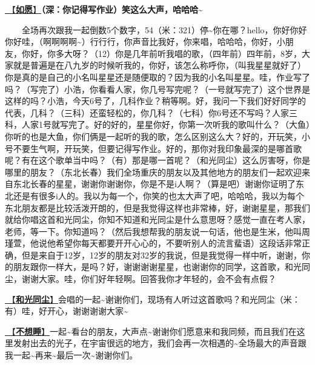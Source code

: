 \documentclass[]{ctexbook}
\begin{document}
\hyperref[As-you-wish]{🎵【\textbf{如愿}】}\textbf{（深：你记得写作业）笑这么大声，哈哈哈\textasciitilde{}}

  全场再次跟我一起倒数5个数字，54（米：321）停\textasciitilde 你在哪？hello，你好你好你好哇，（啊啊啊啊\textasciitilde）行行行，你声音比我好，你来唱，哈哈哈，你好，小朋友，你好，你多大呀？（12）你是几年前听我唱的歌，（四年前）四年前，8岁，大家就是普遍是在八九岁的时候听我的，你好，该怎么称呼你，（叫我星星就好了）你是真的是自己的小名叫星星还是随便取的？因为我的小名叫星星。哇，作业写了吗？（写完了）小浩，你看看人家，你几号写完呢？（一号就写完了）这个世界是这样的吗？小浩，今天6号了，几科作业？稍等啊。好，我问一下我们好好同学的代表，几科？（三科）还蛮轻松的，你几科？（七科）你6号还不写吗？人家三科，人家1号就写完了。好的好的，星星你好，你第一次听我的歌叫什么？（大鱼）你听的也是大鱼，你们俩是一起听的我的歌，怎么区别这么大？好的，开玩笑，小号不要生气啊，开玩笑，但要记得写作业。好的，那你对我印象最深的是哪首歌呢？有在这个歌单当中吗？（有）那是哪一首呢？（和光同尘）这么厉害呀，你是哪里的朋友？（东北长春）我们全场重庆的朋友以及其他地方的朋友们一起欢迎来自东北长春的星星，谢谢你谢谢你，你是不是i人啊？（算是吧）谢谢你证明了东北还是有很多i人的。我以为每一个，你笑的也太大声了吧，哈哈哈，我以为每个东北朋友都是比较活泼开朗的，但是我觉得这样也非常棒，好，谢谢星星，那我们就给你唱这首和光同尘，你知不知道和光同尘是什么意思呀？感觉一直在考人家，老师，等一下。你知道吗？（然后我想帮我的朋友说一句话，他也是生米，他叫周瑾萱，他说他希望你每天都要开开心心的，不要听别人的流言蜚语）这段话非常正确，但是来自于12岁，12岁的朋友对32岁的我说，但是我觉得一样中听，谢谢，你的朋友跟你一样大，是吗？好，谢谢谢谢星星，也谢谢你的同学，这首歌，和光同尘，谢谢大家。哇，你们好年轻啊。回答我你才年轻的，会不会有点假？

\hyperref[stay-with-light]{🎵【\textbf{和光同尘}】}会唱的一起\textasciitilde 谢谢你们，现场有人听过这首歌吗？和光同尘（米：有）哇，好开心，谢谢谢谢大家\textasciitilde{}

\hyperref[donot-want-to-sleep]{🎵【\textbf{不想睡}】}一起\textasciitilde 看台的朋友，大声点\textasciitilde 谢谢你们愿意来和我同频，而且我们在这里发射出去的光子，在宇宙很远的地方，我们会再一次相遇的\textasciitilde 全场最大的声音跟我一起\textasciitilde 再来\textasciitilde 最后一次\textasciitilde 谢谢你们。
\end{document}
